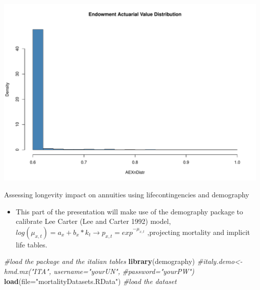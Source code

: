 \documentclass[ignorenonframetext,]{beamer}
\newenvironment{Shaded}{\begin{snugshade}}{\end{snugshade}}
\newcommand{\KeywordTok}[1]{\textcolor[rgb]{0.13,0.29,0.53}{\textbf{{#1}}}}
\newcommand{\DataTypeTok}[1]{\textcolor[rgb]{0.13,0.29,0.53}{{#1}}}
\newcommand{\StringTok}[1]{\textcolor[rgb]{0.31,0.60,0.02}{{#1}}}
\newcommand{\CommentTok}[1]{\textcolor[rgb]{0.56,0.35,0.01}{\textit{{#1}}}}
\newcommand{\NormalTok}[1]{{#1}}
\begin{document}
\begin{frame}

\includegraphics{introToLifecontingencies_files/figure-beamer/AEXn2-1.pdf}

\end{frame}

\begin{frame}[fragile]{Assessing longevity impact on annuities using
lifecontingencies and demography}

\begin{itemize}[<+->]
\itemsep1pt\parskip0pt
\item
  This part of the presentation will make use of the demography package
  to calibrate Lee Carter (Lee and Carter 1992) model,
  $log\left(\mu_{x,t} \right) =a_{x}+b_{x}*k_{t}\rightarrow p_{x,t}=exp^{-\mu_{x,t}}$
  ,projecting mortality and implicit life tables.
\end{itemize}

\begin{Shaded}
\begin{Highlighting}[]
\CommentTok{#load the package and the italian tables}
\KeywordTok{library}\NormalTok{(demography) }
\CommentTok{#italy.demo<-hmd.mx("ITA", username="yourUN", }
\CommentTok{#password="yourPW")}
\KeywordTok{load}\NormalTok{(}\DataTypeTok{file=}\StringTok{"mortalityDatasets.RData"}\NormalTok{) }\CommentTok{#load the dataset}
\end{Highlighting}
\end{Shaded}

\end{frame}
\end{document}
